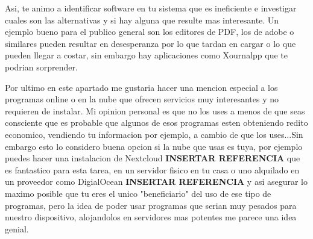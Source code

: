 Asi, te animo a identificar software en tu sistema que es ineficiente e investigar cuales son las alternativas y si hay alguna que resulte mas interesante. Un ejemplo bueno para el publico general son los editores de PDF, los de adobe o similares pueden resultar en desesperanza por lo que tardan en cargar o lo que pueden llegar a costar, sin embargo hay aplicaciones como Xournalpp que te podrian sorprender.

Por ultimo en este apartado me gustaria hacer una mencion especial a los programas online o en la nube que ofrecen servicios muy interesantes y no requieren de instalar. Mi opinion personal es que no los uses a menos de que seas consciente que es probable que algunos de esos programas esten obteniendo redito economico, vendiendo tu informacion por ejemplo, a cambio de que los uses...Sin embargo esto lo considero buena opcion si la nube que usas es tuya, por ejemplo puedes hacer una instalacion de Nextcloud \textbf{INSERTAR REFERENCIA} que es fantastico para esta tarea, en un servidor fisico en tu casa o uno alquilado en un proveedor como DigialOcean \textbf{INSERTAR REFERENCIA} y asi asegurar lo maximo posible que tu eres el unico "beneficiario" del uso de ese tipo de programas, pero la idea de poder usar programas que serian muy pesados para nuestro dispositivo, alojandolos en servidores mas potentes me parece una idea genial.
